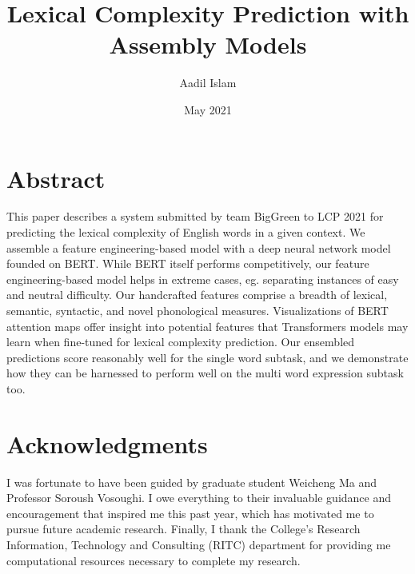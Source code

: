 \documentclass{dcthesis}
\title{Lexical Complexity Prediction with Assembly Models}
\author{Aadil Islam}
\date{May 2021}
\theoremstyle{definition}
\theoremstyle{remark}
\begin{document}
\frontmatter

\maketitle
\restoregeometry

\chapter*{Abstract}
This paper describes a system submitted by team BigGreen to LCP 2021 for predicting the lexical complexity of English words in a given context. We assemble a feature engineering-based model with a deep neural network model founded on BERT. While BERT itself performs competitively, our feature engineering-based model helps in extreme cases, eg. separating instances of easy and neutral difficulty. Our handcrafted features comprise a breadth of lexical, semantic, syntactic, and novel phonological measures. Visualizations of BERT attention maps offer insight into potential features that Transformers models may learn when fine-tuned for lexical complexity prediction. Our ensembled predictions score reasonably well for the single word subtask, and we demonstrate how they can be harnessed to perform well on the multi word expression subtask too.

\chapter*{Acknowledgments}

I was fortunate to have been guided by graduate student Weicheng Ma and Professor Soroush Vosoughi. I owe everything to their invaluable guidance and encouragement that inspired me this past year, which has motivated me to pursue future academic research. Finally, I thank the College's Research Information, Technology and Consulting (RITC) department for providing me computational resources necessary to complete my research.

\tableofcontents
\end{document}

